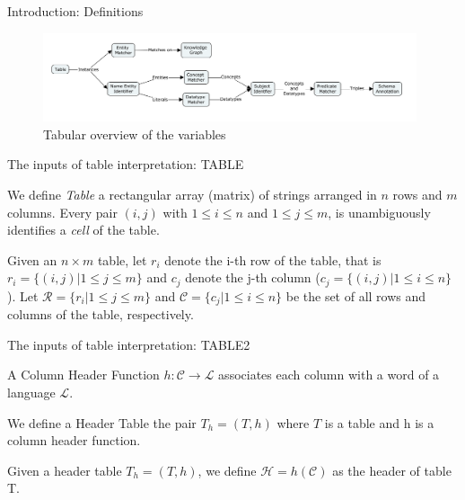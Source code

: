 \documentclass{beamer}
\begin{document}
\begin{frame}{Introduction: Definitions}
	\begin{figure}
		\includegraphics[width=11cm]{images/Formalization_diagram.png}
		\caption{\label{fig:your-figure2} Tabular overview of the variables}
	\end{figure}
\end{frame}

\begin{frame}{The inputs of table interpretation: TABLE}
	\begin{definition}[Table]
		We define \textit{Table} a rectangular array (matrix) of strings arranged in $n$ rows and $m$ columns. Every pair $(i,j)$ with $1\leq i \leq n$ and $1\leq j \leq m$, is unambiguously identifies a \textit{cell} of the table.
	\end{definition}

	\begin{definition}
		Given an $n\times m$ table, let $r_i$ denote the i-th row of the table, that is $r_i =\{(i,j) | 1\leq j \leq m\}$ and  $c_j$ denote the j-th column ($c_j =\{(i,j) |1\leq i \leq n\}$).
		Let $\mathcal{R} = \{r_i | 1\leq j \leq m\}$ and $\mathcal{C} = \{c_j|1\leq i \leq n\}$ be the set of all rows and columns of the table, respectively.
	\end{definition}
\end{frame}

\begin{frame}{The inputs of table interpretation: TABLE2}
	\begin{definition}
		A Column Header Function $h: \mathcal{C}\to \mathcal{L}$ associates each column with a word of a language $\mathcal{L}$.
	\end{definition}

	\begin{definition}
		We define a Header Table the pair $T_h =(T, h)$ where  $T$ is a table and h is a column header function.
	\end{definition}

	\begin{definition}[Header]
		Given a header table $T_h =(T, h)$, we define $\mathcal{H}=h(\mathcal{C})$ as the header of table T.
	\end{definition}
\end{frame}
\end{document}
